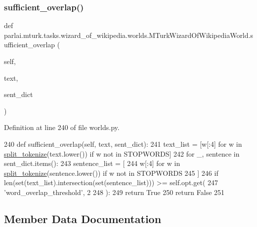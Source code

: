 \subsubsection{\texorpdfstring{sufficient\+\_\+overlap()}{sufficient\_overlap()}}
{\footnotesize\ttfamily def parlai.\+mturk.\+tasks.\+wizard\+\_\+of\+\_\+wikipedia.\+worlds.\+M\+Turk\+Wizard\+Of\+Wikipedia\+World.\+sufficient\+\_\+overlap (\begin{DoxyParamCaption}\item[{}]{self,  }\item[{}]{text,  }\item[{}]{sent\+\_\+dict }\end{DoxyParamCaption})}



Definition at line 240 of file worlds.\+py.


\begin{DoxyCode}
240     \textcolor{keyword}{def }sufficient\_overlap(self, text, sent\_dict):
241         text\_list = [w[:4] \textcolor{keywordflow}{for} w \textcolor{keywordflow}{in} \hyperlink{namespaceparlai_1_1mturk_1_1tasks_1_1wizard__of__wikipedia_1_1worlds_a040aaf5ecfbddec14f321279454f85a8}{split\_tokenize}(text.lower()) \textcolor{keywordflow}{if} w \textcolor{keywordflow}{not} \textcolor{keywordflow}{in} STOPWORDS]
242         \textcolor{keywordflow}{for} \_, sentence \textcolor{keywordflow}{in} sent\_dict.items():
243             sentence\_list = [
244                 w[:4] \textcolor{keywordflow}{for} w \textcolor{keywordflow}{in} \hyperlink{namespaceparlai_1_1mturk_1_1tasks_1_1wizard__of__wikipedia_1_1worlds_a040aaf5ecfbddec14f321279454f85a8}{split\_tokenize}(sentence.lower()) \textcolor{keywordflow}{if} w \textcolor{keywordflow}{not} \textcolor{keywordflow}{in} STOPWORDS
245             ]
246             \textcolor{keywordflow}{if} len(set(text\_list).intersection(set(sentence\_list))) >= self.opt.get(
247                 \textcolor{stringliteral}{'word\_overlap\_threshold'}, 2
248             ):
249                 \textcolor{keywordflow}{return} \textcolor{keyword}{True}
250         \textcolor{keywordflow}{return} \textcolor{keyword}{False}
251 
\end{DoxyCode}


\subsection{Member Data Documentation}
\mbox{\label{classparlai_1_1mturk_1_1tasks_1_1wizard__of__wikipedia_1_1worlds_1_1MTurkWizardOfWikipediaWorld_a1d8322b60328d9bee28d25ff2b55db27}} 
